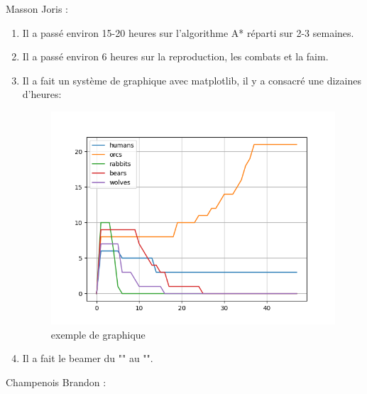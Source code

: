 \documentclass[a4paper, 11pt]{article}
\begin{document}
\newpage
Masson Joris : \\
\begin{enumerate}
\item Il a passé environ 15-20 heures sur l’algorithme  A* réparti sur 2-3 semaines.\\
\item Il a passé environ 6 heures sur la reproduction, les combats et la faim.\\
\item Il a fait un système de graphique avec matplotlib, il y a consacré une dizaines d'heures:\\
\begin{figure}[ht!]
 \centering
 \includegraphics[width=1\linewidth]{images/graph.png}
 \caption{exemple de graphique}
 \label{fig::example::one}
\end{figure}
\item Il a fait le beamer du "" au "".\\
\end{enumerate}
\newpage
Champenois Brandon : \\
\end{document}
